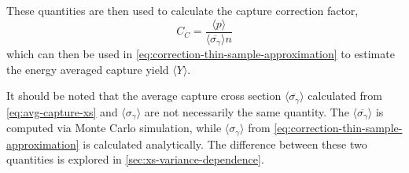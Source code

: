 These quantities are then used to calculate the capture correction factor,
\begin{equation}
    \label{eq:capture-correction-factor-calc}
    C_{C} = \frac{\langle p \rangle }{\langle \overline{ \sigma_{\gamma} } \rangle n}
\end{equation}
which can then be used in \autoref{eq:correction-thin-sample-approximation} to estimate the energy averaged capture yield $\langle Y \rangle$. 

It should be noted that the average capture cross section $\langle \overline{\sigma_{\gamma}} \rangle$ calculated from \autoref{eq:avg-capture-xs} and $\langle \sigma_{\gamma} \rangle$ are not necessarily the same quantity. The $\langle \overline{\sigma_{\gamma}} \rangle$ is computed via Monte Carlo simulation, while $\langle \sigma_{\gamma} \rangle$ from \autoref{eq:correction-thin-sample-approximation} is calculated analytically. The difference between these two quantities is explored in \autoref{sec:xs-variance-dependence}.

